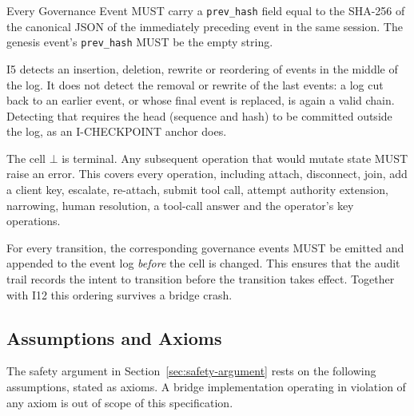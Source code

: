 \begin{invariant}\label{inv:I5}
Every Governance Event MUST carry a \texttt{prev\_hash} field equal
to the SHA-256 of the canonical JSON of the immediately preceding
event in the same session. The genesis event's \texttt{prev\_hash}
MUST be the empty string.

I5 detects an insertion, deletion, rewrite or reordering of events in
the middle of the log. It does not detect the removal or rewrite of the
last events: a log cut back to an earlier event, or whose final event is
replaced, is again a valid chain. Detecting that requires the head
(sequence and hash) to be committed outside the log, as an
I-CHECKPOINT anchor does.
\end{invariant}

\begin{invariant}[I6 --- Terminality]\label{inv:I6}
The cell $\bot$ is terminal. Any subsequent operation that would
mutate state MUST raise an error. This covers every operation, including
attach, disconnect, join, add a client key, escalate, re-attach, submit
tool call, attempt authority extension, narrowing, human resolution, a
tool-call answer and the operator's key operations.
\end{invariant}

\begin{invariant}\label{inv:I7}
For every transition, the corresponding governance events MUST be
emitted and appended to the event log \emph{before} the cell is
changed. This ensures that the audit trail records the intent to
transition before the transition takes effect. Together with I12 this
ordering survives a bridge crash.
\end{invariant}

\subsection{Assumptions and Axioms}\label{sec:axioms}

The safety argument in Section~\ref{sec:safety-argument} rests on the
following assumptions, stated as axioms. A bridge implementation
operating in violation of any axiom is out of scope of this
specification.

